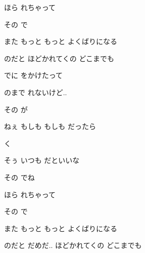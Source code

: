 \documentclass[14pt]{ltjsarticle}
\begin{document}
{  ほら   れちゃって
  \jisho{}

  その で
  \jisho{}

  また もっと もっと よくばりになる
  \jisho{}

  のだと  ほどかれてくの どこまでも
  \jisho{}

\item
  でに をかけたって
  \jisho{}

  のまで れないけど..
  \jisho{}

\item
  その が
  \jisho{}

  ねぇ もしも もしも だったら
  \jisho{}

  く 
  \jisho{}

  そぅ いつも だといいな
  \jisho{}

\item
  その でね
  \jisho{}

  ほら   れちゃって
  \jisho{}

  その で
  \jisho{}

  また もっと もっと よくばりになる
  \jisho{}

  のだと だめだ.. ほどかれてくの どこまでも
  \jisho{}


}
\end{document}
